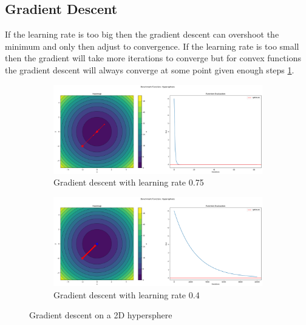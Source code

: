 \subsection{Gradient Descent}
\label{sec:gradient-descent}

If the learning rate is too big then the gradient descent can overshoot the minimum and only then adjust to convergence. If the learning rate is too small then the gradient will take more iterations to converge but for convex functions the gradient descent will always converge at some point given enough steps \ref{fig:gd-hypersphere}.

\begin{figure}[H]
    \begin{subfigure}{0.5\linewidth}
        \includegraphics[width=\linewidth]{lab3/imgs/gd_sphere_75.png}
        \caption{Gradient descent with learning rate 0.75}
    \end{subfigure}
    \begin{subfigure}{0.5\linewidth}
        \includegraphics[width=\linewidth]{lab3/imgs/gd_sphere_04.png}
        \caption{Gradient descent with learning rate 0.4}
    \end{subfigure}
    \caption{Gradient descent on a 2D hypersphere}
    \label{fig:gd-hypersphere}
\end{figure}

